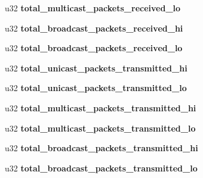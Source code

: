 \begin{DoxyCompactItemize}
\item 
\hypertarget{structbnx2x__eth__q__stats_a8c229cd47e4d6ce1bd2ff1d806c9273d}{
u32 {\bfseries total\_\-multicast\_\-packets\_\-received\_\-lo}}
\label{structbnx2x__eth__q__stats_a8c229cd47e4d6ce1bd2ff1d806c9273d}

\item 
\hypertarget{structbnx2x__eth__q__stats_aac349f2cb207e4a90abbd909843dd1be}{
u32 {\bfseries total\_\-broadcast\_\-packets\_\-received\_\-hi}}
\label{structbnx2x__eth__q__stats_aac349f2cb207e4a90abbd909843dd1be}

\item 
\hypertarget{structbnx2x__eth__q__stats_aa261cf1ed170a0462a2cd9d875d4fad1}{
u32 {\bfseries total\_\-broadcast\_\-packets\_\-received\_\-lo}}
\label{structbnx2x__eth__q__stats_aa261cf1ed170a0462a2cd9d875d4fad1}

\item 
\hypertarget{structbnx2x__eth__q__stats_a6d327be8f5a5bb1737bbf0126c738e47}{
u32 {\bfseries total\_\-unicast\_\-packets\_\-transmitted\_\-hi}}
\label{structbnx2x__eth__q__stats_a6d327be8f5a5bb1737bbf0126c738e47}

\item 
\hypertarget{structbnx2x__eth__q__stats_a82ac9584482456a3d6e2667699a1ea10}{
u32 {\bfseries total\_\-unicast\_\-packets\_\-transmitted\_\-lo}}
\label{structbnx2x__eth__q__stats_a82ac9584482456a3d6e2667699a1ea10}

\item 
\hypertarget{structbnx2x__eth__q__stats_ab194e34ad3ccd37cccb3f896d34c092c}{
u32 {\bfseries total\_\-multicast\_\-packets\_\-transmitted\_\-hi}}
\label{structbnx2x__eth__q__stats_ab194e34ad3ccd37cccb3f896d34c092c}

\item 
\hypertarget{structbnx2x__eth__q__stats_a9eb28c30836ae32c618ac3067b5b664b}{
u32 {\bfseries total\_\-multicast\_\-packets\_\-transmitted\_\-lo}}
\label{structbnx2x__eth__q__stats_a9eb28c30836ae32c618ac3067b5b664b}

\item 
\hypertarget{structbnx2x__eth__q__stats_a05b3b8bc0f3cca616177314bee838db1}{
u32 {\bfseries total\_\-broadcast\_\-packets\_\-transmitted\_\-hi}}
\label{structbnx2x__eth__q__stats_a05b3b8bc0f3cca616177314bee838db1}

\item 
\hypertarget{structbnx2x__eth__q__stats_a19882afc161b961ab10c3bcac5518cc1}{
u32 {\bfseries total\_\-broadcast\_\-packets\_\-transmitted\_\-lo}}
\label{structbnx2x__eth__q__stats_a19882afc161b961ab10c3bcac5518cc1}


\end{DoxyCompactItemize}
